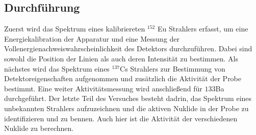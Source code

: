 \cite{aufbau}
\subsection{Durchführung}
Zuerst wird das Spektrum eines kalibriereten $^{152}$ Eu Strahlers erfasst, um eine Energiekalibration der Apparatur und eine Messung der
Vollenergienachweiswahrscheinlichkeit des Detektors durchzuführen. Dabei sind sowohl die Position der Linien als auch deren Intensität zu bestimmen.
Als nächstes wird das Spektrum eines $^{137} $Cs Strahlers zur Bestimmung von Detektoreigenschaften aufgenommen und zusätzlich die Aktivität der Probe
bestimmt. Eine weiter Aktivitätsmessung wird anschließend für ${133}$Ba durchgeführt. Der letzte Teil des Versuches besteht dadrin, das Spektrum eines
unbekannten Strahlers aufzuzeichnen und die aktiven Nuklide in der Probe zu identifizieren und zu bennen. Auch hier ist die Aktivität der 
verschiedenen Nuklide zu berechnen.



